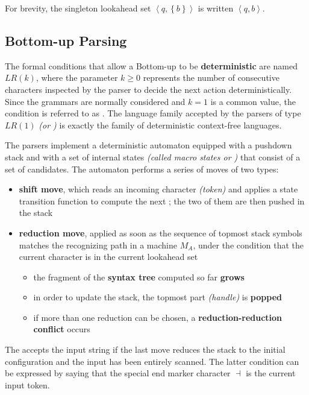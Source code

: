 \documentclass[english]{article}
\begin{document}
\bigskip
For brevity, the singleton lookahead set \(\left\langle q, \left\{ b \right\} \right\rangle\) is written \(\left\langle q, b \right\rangle\).

\subsection{Bottom-up Parsing}

The formal conditions that allow a Bottom-up to be \textbf{deterministic} are named \(\textit{LR}(k)\), where the parameter \(k \geq 0\) represents the number of consecutive characters inspected by the parser to decide the next action deterministically.
Since the \EBNF grammars are normally considered and \(k=1\) is a common value, the condition is referred to as \elro.
The language family accepted by the parsers of type \(\textit{LR}(1)\) \textit{(or \elro)} is exactly the family \DET of deterministic context-free languages.

The \elro parsers implement a deterministic automaton equipped with a pushdown stack and with a set of internal states \textit{(called macro states or \mstates)} that consist of a set of candidates.
The automaton performs a series of moves of two types:

\begin{itemize}
  \item \textbf{shift move}, which reads an incoming character \textit{(token)} and applies a state transition function to compute the next \mstate; the two of them are then pushed in the stack
  \item \textbf{reduction move}, applied as soon as the sequence of topmost stack symbols matches the recognizing path in a machine \(M_A\), under the condition that the current character is in the current lookahead set
        \begin{itemize}[label=\(\rightarrow\)]
          \item the fragment of the \textbf{syntax tree} computed so far \textbf{grows}
          \item in order to update the stack, the topmost part \textit{(handle)} is \textbf{popped}
          \item if more than one reduction can be chosen, a \textbf{reduction-reduction conflict} occurs
        \end{itemize}
\end{itemize}

The \PDA accepts the input string if the last move reduces the stack to the initial configuration and the input has been entirely scanned.
The latter condition can be expressed by saying that the special end marker character \(\dashv\) is the current input token.
\end{document}
